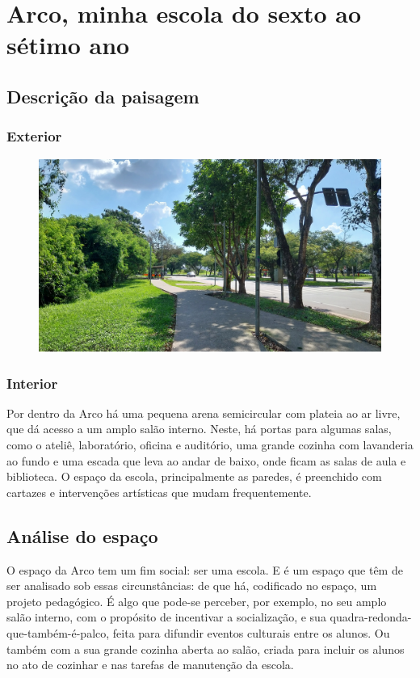 \documentclass[12pt]{article}
\begin{document}
\section{Arco, minha escola do sexto ao sétimo ano}
\subsection{Descrição da paisagem}
\subsubsection{Exterior}
\begin{figure}[H]
    \centering
    \includegraphics[width = \textwidth]{./img/Ponto.jpg}
\end{figure}
\subsubsection{Interior}
Por dentro da Arco há uma pequena arena semicircular com plateia ao ar livre, que dá acesso a um amplo salão interno. Neste, há portas para algumas salas, como o ateliê, laboratório, oficina e auditório, uma grande cozinha com lavanderia ao fundo e uma escada que leva ao andar de baixo, onde ficam as salas de aula e biblioteca. O espaço da escola, principalmente as paredes, é preenchido com cartazes e intervenções artísticas que mudam frequentemente.
\subsection{Análise do espaço}
O espaço da Arco tem um fim social: ser uma escola. E é um espaço que têm de ser analisado sob essas circunstâncias: de que há, codificado no espaço, um projeto pedagógico. É algo que pode-se perceber, por exemplo, no seu amplo salão interno, com o propósito de incentivar a socialização, e sua quadra-redonda-que-também-é-palco, feita para difundir eventos culturais entre os alunos. Ou também com a sua grande cozinha aberta ao salão, criada para incluir os alunos no ato de cozinhar e nas tarefas de manutenção da escola.
\end{document}
